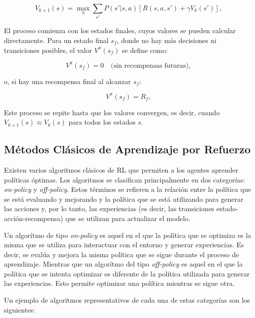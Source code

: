 \documentclass[a4paper,12pt, twoside]{report}
\begin{document}
\begin{equation}
V_{k+1}(s) = \max_{a} \sum_{s'} P(s'|s,a) \left[ R(s,a,s') + \gamma V_k(s') \right],
\end{equation}

El proceso comienza con los estados finales, cuyos valores se pueden calcular directamente. 
Para un estado final \(s_f\), donde no hay más decisiones ni transiciones posibles, el 
valor \(V^\pi(s_f)\) se define como:

\begin{equation}
V^\pi(s_f) = 0 \quad \text{(sin recompensas futuras)},
\end{equation}

o, si hay una recompensa final al alcanzar \(s_f\):

\begin{equation}
V^\pi(s_f) = R_f,
\end{equation}

Este proceso se repite hasta que los valores convergen, es decir, cuando \(V_{k+1}(s) 
\approx V_k(s)\) para todos los estados \(s\).


\subsection{Métodos Clásicos de Aprendizaje por Refuerzo}

Existen varios algoritmos clásicos de RL que permiten a los agentes aprender políticas óptimas. Los 
algoritmos se clasifican principalmente en dos categorías: \textit{on-policy} y \textit{off-policy}. 
Estos términos se refieren a la relación entre la política que se está evaluando y mejorando y la 
política que se está utilizando para generar las acciones y, por lo tanto, las experiencias (es decir, 
las transiciones estado-acción-recompensa) que se utilizan para actualizar el modelo.

Un algorítmo de tipo \textit{on-policy} es aquel en el que la política que se optimiza es la misma que 
se utiliza para interactuar con el entorno y generar experiencias. Es decir, se evalúa y mejora la misma
política que se sigue durante el proceso de aprendizaje. Mientras que un algorítmo del tipo \textit{off-policy}
es aquel en el que la política que se intenta optimizar es diferente de la política utilizada para generar
las experiencias. Esto permite optimizar una política mientras se sigue otra.

Un ejemplo de algoritmos representativos de cada una de estas categorías son los siguientes:
\end{document}
